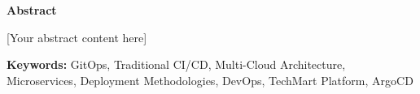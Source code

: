 \thispagestyle{empty}
\vspace*{\fill}

\begin{center}
{\Large \textbf{Abstract}}
\end{center}

\vspace{1cm}

[Your abstract content here]

\textbf{Keywords:} GitOps, Traditional CI/CD, Multi-Cloud Architecture, Microservices, Deployment Methodologies, DevOps, TechMart Platform, ArgoCD

\vspace*{\fill}
\newpage